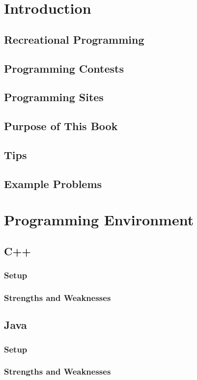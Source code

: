 \documentclass[12pt]{article}
\begin{document}
\section{Introduction}
\subsection{Recreational Programming}
\subsection{Programming Contests}
\subsection{Programming Sites}
\subsection{Purpose of This Book}
\subsection{Tips}
\subsection{Example Problems}

\hspace{0mm}

\section{Programming Environment}
\subsection{C++}
\subsubsection{Setup}
\subsubsection{Strengths and Weaknesses}
\subsection{Java}
\subsubsection{Setup}
\subsubsection{Strengths and Weaknesses}
\end{document}
